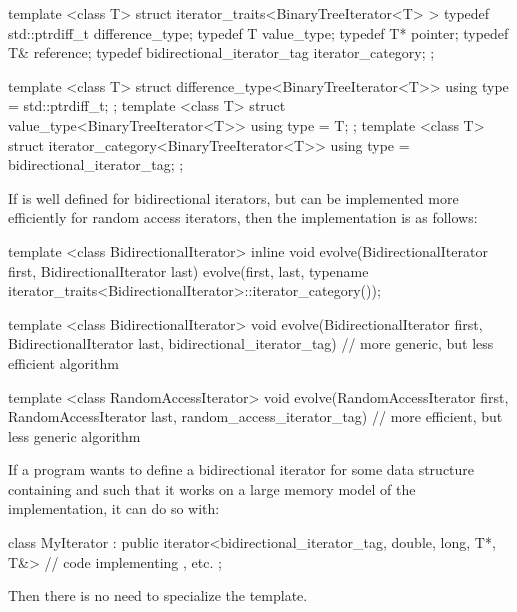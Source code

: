 \begin{removedblock}
\begin{codeblock}
template <class T> struct iterator_traits<BinaryTreeIterator<T> > {
  typedef std::ptrdiff_t difference_type;
  typedef T value_type;
  typedef T* pointer;
  typedef T& reference;
  typedef bidirectional_iterator_tag iterator_category;
};
\end{codeblock}
\end{removedblock}
\begin{addedblock}
\begin{codeblock}
template <class T> struct difference_type<BinaryTreeIterator<T>> {
  using type = std::ptrdiff_t;
};
template <class T> struct value_type<BinaryTreeIterator<T>> {
  using type = T;
};
template <class T> struct iterator_category<BinaryTreeIterator<T>> {
  using type = bidirectional_iterator_tag;
};
\end{codeblock}
\end{addedblock}

\exitexample

\begin{removedblock}
\pnum
\enterexample
If
is well defined for bidirectional iterators, but can be implemented more
efficiently for random access iterators, then the implementation is as
follows:

\begin{codeblock}
template <class BidirectionalIterator>
inline void
evolve(BidirectionalIterator first, BidirectionalIterator last) {
  evolve(first, last,
    typename iterator_traits<BidirectionalIterator>::iterator_category());
}

template <class BidirectionalIterator>
void evolve(BidirectionalIterator first, BidirectionalIterator last,
  bidirectional_iterator_tag) {
  // more generic, but less efficient algorithm
}

template <class RandomAccessIterator>
void evolve(RandomAccessIterator first, RandomAccessIterator last,
  random_access_iterator_tag) {
  // more efficient, but less generic algorithm
}
\end{codeblock}
\exitexample

\pnum
\enterexample
If a \Cpp program wants to define a bidirectional iterator for some data structure containing
and such that it
works on a large memory model of the implementation, it can do so with:

\begin{codeblock}
class MyIterator :
  public iterator<bidirectional_iterator_tag, double, long, T*, T&> {
  // code implementing \tcode{++}, etc.
};
\end{codeblock}

\pnum
Then there is no need to specialize the
 template.
\exitexample
\end{removedblock}

